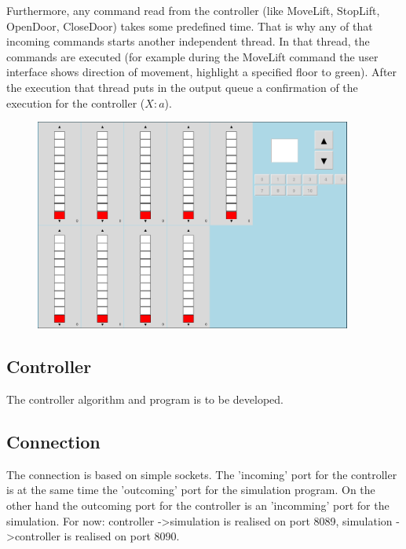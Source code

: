 \documentclass[12pt]{article}
\begin{document}
Furthermore, any command read from the controller (like MoveLift, StopLift, OpenDoor, CloseDoor) takes some predefined time. That is why any of that incoming commands starts another independent thread. In that thread, the commands are executed (for example during the MoveLift command the user interface shows direction of movement, highlight a specified floor to green). After the execution that thread puts in the output queue a confirmation of the execution for the controller ($X:a$).
	\begin{figure}
	\includegraphics[width=0.93\textwidth]{img/winda.png}
	\end{figure}

\subsection{Controller}
The controller algorithm and program is to be developed.

\subsection{Connection}
The connection is based on simple sockets. The 'incoming' port for the controller is at the same time the 'outcoming' port for the simulation program. On the other hand the outcoming port for the controller is an 'incomming' port for  the simulation.
\newline
\newline
For now:
\newline
controller -\textgreater simulation is realised on port 8089,
\newline
simulation -\textgreater controller is realised on port 8090.

\newpage
\end{document}
